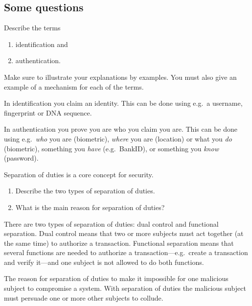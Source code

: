 \subsection{Some questions}

\begin{frame}
  \begin{exercise}
    Describe the terms
    \begin{enumerate}
      \item identification and
      \item authentication.
    \end{enumerate}
    Make sure to illustrate your explanations by examples.
    You must also give an example of a mechanism for each of the terms.
  \end{exercise}
\end{frame}

\begin{frame}
  \begin{solution}
    In identification you claim an identity.
    This can be done using e.g.~a username, fingerprint or DNA sequence.

    In authentication you prove you are who you claim you are.
    This can be done using e.g.~\emph{who} you are (biometric), \emph{where} 
    you are (location) or what you \emph{do} (biometric), something you 
    \emph{have} (e.g.~BankID), or something you \emph{know} (password).
  \end{solution}
\end{frame}


\begin{frame}
  \begin{exercise}
    Separation of duties is a core concept for security.
    \begin{enumerate}
      \item Describe the two types of separation of duties.
      \item What is the main reason for separation of duties?
    \end{enumerate}
  \end{exercise}
\end{frame}

\begin{frame}
  \begin{solution}
    There are two types of separation of duties:
    dual control and functional separation.
    Dual control means that two or more subjects must act together (at the same 
    time) to authorize a transaction.
    Functional separation means that several functions are needed to authorize 
    a transaction---e.g.~create a transaction and verify it---and one subject 
    is not allowed to do both functions.

    The reason for separation of duties to make it impossible for one malicious 
    subject to compromise a system.
    With separation of duties the malicious subject must persuade one or more 
    other subjects to collude.
  \end{solution}
\end{frame}

